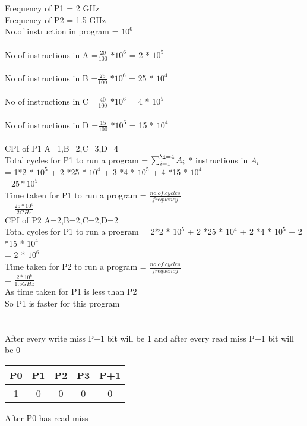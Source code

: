 \documentclass[12pt]{article}
\begin{document}
\section{}
Frequency of P1 = 2 GHz\\
Frequency of P2 = 1.5 GHz \\
No.of instruction in program = $10^{6}$\\\\
No of instructions in A
=\(\frac{20}{100}\) $*10^{6}$  = 2 * $10^{5}$\\\\
No of instructions in B
=\(\frac{25}{100}\) $*10^{6}$  = 25 * $10^{4}$\\\\
No of instructions in C
=\(\frac{40}{100}\) $*10^{6}$  = 4 * $10^{5}$\\\\
No of instructions in D
=\(\frac{15}{100}\) $*10^{6}$  = 15 * $10^{4}$\\\\
CPI of P1 A=1,B=2,C=3,D=4 \\
Total cycles for P1 to run a program = $\sum_{i=1}^{\i=4}
 A_{i}$ * instructions in $A_{i}$\\
 = 1*2 * $10^{5}$ + 2 *25 * $10^{4}$ + 3 *4 * $10^{5}$ + 4 *15 * $10^{4}$\\ 
 =$25 * 10^{5}$\\
Time taken for P1 to run a program = 
\(\frac{no. of .cycles}{frequency}\)\\=
\(\frac{25 * 10^{5}}{2GHz}\)\\
CPI of P2 A=2,B=2,C=2,D=2 \\
Total cycles for P1 to run a program 
 = 2*2 * $10^{5}$ + 2 *25 * $10^{4}$ + 2 *4 * $10^{5}$ + 2 *15 * $10^{4}$\\
 = 2 * $ 10^{6}$\\
 Time taken for P2 to run a program = 
 \(\frac{no. of .cycles}{frequency}\)\\=
 \(\frac{2 * 10^{6}}{1.5GHz}\)\\
As time taken for P1 is less than P2 \\
So P1 is faster for this program
\section{}
After every write miss P+1 bit will be 1 and after every read miss P+1 bit will be 0\\


	\begin{tabular}{ |c|c|c|c|c| } 
		
		P0 & P1 & P2 & P3 & P+1 \\ 
		\hline
		1 & 0 & 0 & 0 & 0 \\ 
		\hline
	\end{tabular}
After P0 has read miss\\
\end{document}
